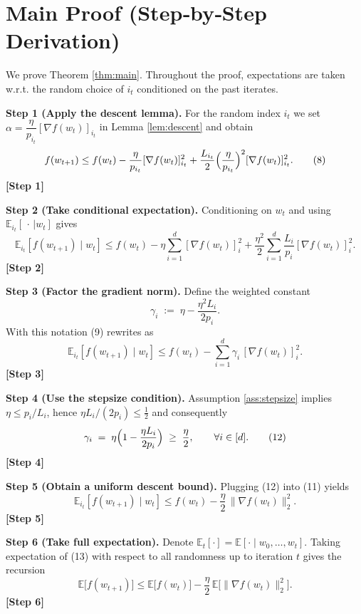 \documentclass{article}
\newcommand{\EE}{\mathbb{E}}
\begin{document}
\section*{Main Proof (Step‑by‑Step Derivation)}
We prove Theorem \ref{thm:main}. Throughout the proof,
expectations are taken w.r.t. the random choice of $i_t$ conditioned
on the past iterates.

\noindent\textbf{Step 1 (Apply the descent lemma).}
For the random index $i_t$ we set $\alpha=\dfrac{\eta}{p_{i_t}}
[\nabla f(w_t)]_{i_t}$ in Lemma \ref{lem:descent} and obtain
\[
f(w_{t+1})
\le f(w_t)-\frac{\eta}{p_{i_t}}[\nabla f(w_t)]_{i_t}^{2}
+\frac{L_{i_t}}{2}\Bigl(\frac{\eta}{p_{i_t}}\Bigr)^{2}
[\nabla f(w_t)]_{i_t}^{2}.
\tag{8}
\]
\textbf{[Step 1]}

\noindent\textbf{Step 2 (Take conditional expectation).}
Conditioning on $w_t$ and using $\EE_{i_t}[\,\cdot\,|w_t]$ gives
\[
\EE_{i_t}[f(w_{t+1})\mid w_t]
\le f(w_t)-\eta\sum_{i=1}^{d}[\nabla f(w_t)]_{i}^{2}
+\frac{\eta^{2}}{2}\sum_{i=1}^{d}\frac{L_i}{p_i}
[\nabla f(w_t)]_{i}^{2}.
\tag{9}
\]
\textbf{[Step 2]}

\noindent\textbf{Step 3 (Factor the gradient norm).}
Define the weighted constant
\[
\gamma_i\;:=\;\eta-\frac{\eta^{2}L_i}{2p_i}.
\tag{10}
\]
With this notation (9) rewrites as
\[
\EE_{i_t}[f(w_{t+1})\mid w_t]
\le f(w_t)-\sum_{i=1}^{d}\gamma_i\,
[\nabla f(w_t)]_{i}^{2}.
\tag{11}
\]
\textbf{[Step 3]}

\noindent\textbf{Step 4 (Use the stepsize condition).}
Assumption \ref{ass:stepsize} implies $\eta\le p_i/L_i$,
hence $\eta L_i/(2p_i)\le \tfrac12$ and consequently
\[
\gamma_i\;=\;\eta\Bigl(1-\frac{\eta L_i}{2p_i}\Bigr)
\;\ge\;\frac{\eta}{2},\qquad\forall i\in[d].
\tag{12}
\]
\textbf{[Step 4]}

\noindent\textbf{Step 5 (Obtain a uniform descent bound).}
Plugging (12) into (11) yields
\[
\EE_{i_t}[f(w_{t+1})\mid w_t]
\le f(w_t)-\frac{\eta}{2}\,\bigl\|\nabla f(w_t)\bigr\|_{2}^{2}.
\tag{13}
\]
\textbf{[Step 5]}

\noindent\textbf{Step 6 (Take full expectation).}
Denote $\EE_t[\cdot]=\EE[\cdot\mid w_0,\dots ,w_t]$.
Taking expectation of (13) with respect to all randomness up to
iteration $t$ gives the recursion
\[
\EE\!\bigl[f(w_{t+1})\bigr]
\le \EE\!\bigl[f(w_{t})\bigr]
-\frac{\eta}{2}\,
\EE\!\bigl[\|\nabla f(w_t)\|_{2}^{2}\bigr].
\tag{14}
\]
\textbf{[Step 6]}
\end{document}
